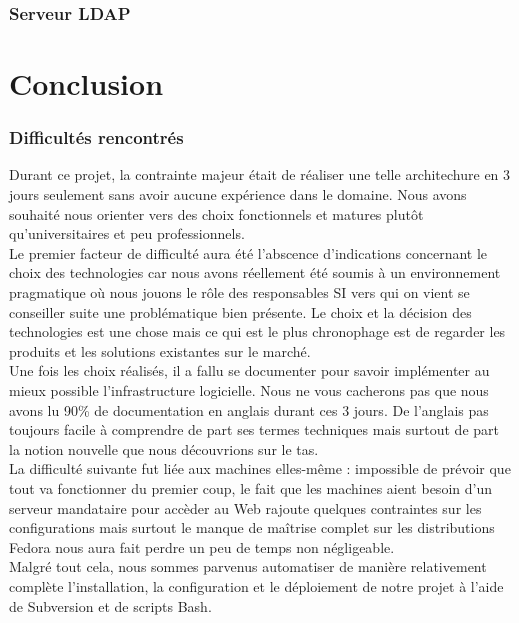 \documentclass[11pt,a4paper]{report}
\begin{document}
        \section{Serveur LDAP}
    \part{Conclusion}
        \section{Difficultés rencontrés}
            
            Durant ce projet, la contrainte majeur était de réaliser une telle architechure en 3 jours seulement sans avoir aucune expérience dans le domaine. Nous avons souhaité nous orienter vers des choix fonctionnels et matures plutôt qu'universitaires et peu professionnels.\\
            
            Le premier facteur de difficulté aura été l'abscence d'indications concernant le choix des technologies car nous avons réellement été soumis à un environnement pragmatique où nous jouons le rôle des responsables SI vers qui on vient se conseiller suite une problématique bien présente.
            Le choix et la décision des technologies est une chose mais ce qui est le plus chronophage est de regarder les produits et les solutions existantes sur le marché.\\
            
            Une fois les choix réalisés, il a fallu se documenter pour savoir implémenter au mieux possible l'infrastructure logicielle. Nous ne vous cacherons pas que nous avons lu 90\% de documentation en anglais durant ces 3 jours. De l'anglais pas toujours facile à comprendre de part ses termes techniques mais surtout de part la notion nouvelle que nous découvrions sur le tas.\\
            
            La difficulté suivante fut liée aux machines elles-même : impossible de prévoir que tout va fonctionner du premier coup, le fait que les machines aient besoin d'un serveur mandataire pour accèder au Web rajoute quelques contraintes sur les configurations mais surtout le manque de maîtrise complet sur les distributions Fedora nous aura fait perdre un peu de temps non négligeable.\\
            
            Malgré tout cela, nous sommes parvenus automatiser de manière relativement complète l'installation, la configuration et le déploiement de notre projet à l'aide de Subversion et de scripts Bash.
        
\end{document}
